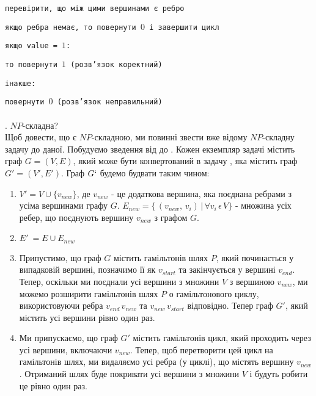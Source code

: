 \documentclass[14pt]{article}
\begin{document}
\begin{spacing}{1.175}
        \quad \texttt{\quad перевірити, що між цими вершинами є ребро}
        
        \quad \texttt{\quad якщо ребра немає, то повернути \(0\) і завершити цикл}
        
        \quad \texttt{якщо value = \(1\):}
        
        \quad \texttt{\quad то повернути \(1\) (розв'язок коректний)}
        
        \quad \texttt{інакше:}
        
        \quad \texttt{\quad повернути \(0\) (розв'язок неправильний)}\\

        
        \\
        . \hamcycle \(NP\)-складна? \\
        Щоб довести, що \hamcycle є \(NP\)-складною, ми повинні звести вже відому \(NP\)-складну задачу до даної. Побудуємо зведення від \dhampath до \hamcycle. Кожен екземпляр задачі \dhampath містить граф \(G = (V, E) \), який може бути конвертований в задачу \hamcycle, яка містить граф \(G' = (V', E')\). Граф \(G`\) будемо будвати таким чином:
        \begin{enumerate}
            \item \(V' = V \cup \{v_{new}\}\), де \(v_{new}\) - це додаткова вершина, яка поєднана ребрами з усіма вершинами графу \(G\). \(E_{new} = \{\,(v_{new},\,v_i)\,|\,\forall v_i\,\epsilon\,V\}\) - множина усіх ребер, що поєднують вершину \(v_{new}\) з графом \(G\).
            \item \(E'\ = E \cup E_{new}\) 
            \item Припустимо, що граф \(G\) містить гамільтонів шлях \(P\), який починається у випадковій вершині, позначимо її як \(v_{start}\) та закінчується у вершині \(v_{end}\). Тепер, оскільки ми поєднали усі вершини з множини \(V\) з вершиною \(v_{new}\), ми можемо розширити гамільтонів шлях \(P\) о гамільтонового циклу, використовуючи ребра \(v_{end}\, v_{new}\) та \(v_{new}\, v_{start}\) відповідно. Тепер граф \(G'\), який містить усі вершини рівно один раз.
            \item Ми припускаємо, що граф \(G'\) містить гамільтонів цикл, який проходить через усі вершини, включаючи \(v_{new}\). Тепер, щоб перетворити цей цикл на гамільтонів шлях, ми видаляємо усі ребра (у циклі), що містять вершину \(v_{new}\). Отриманий шлях буде покривати усі вершини з множини \(V\) і будуть робити це рівно один раз.
        \end{enumerate}
        

\end{spacing}
\end{document}
